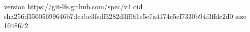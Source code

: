 version https://git-lfs.github.com/spec/v1
oid sha256:f35005699646b7dcabc3fedf3282d3ff0f1e5c7a4174c5cf7330b94f3ffdc2d0
size 1048672
